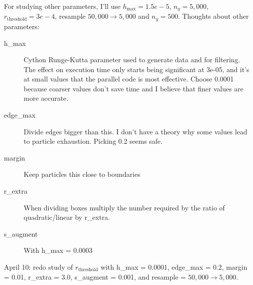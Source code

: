 \documentclass[12pt]{article}
\begin{document}
For studying other parameters, I'll use $h_{\text{max}}=1.5e-5$,
$n_y=5,000$, $r_{\text{threshold}} = 3e-4$, resample
$50,000 \rightarrow 5,000$ and $n_y = 500$.  Thoughts about other
parameters:
\begin{description}
\item[h\_max] Cython Runge-Kutta parameter used to generate data and
  for filtering.  The effect on execution time only starts being
  significant at 3e-05, and it's at small values that the parallel
  code is most effective.  Choose 0.0001 because coarser values
  don't save time and I believe that finer values are more accurate.\\
  
\item[edge\_max] Divide edges bigger than this.  I don't have a theory
  why some values lead to particle exhaustion.  Picking 0.2 seems safe.\\
  
\item[margin] Keep particles this close to boundaries\\
    
\item[r\_extra] When dividing boxes multiply the number required by
  the ratio of quadratic/linear by r\_extra.\\
  
\item[s\_augment] With h\_max = 0.0003\\
  
\end{description}

April 10: redo study of $r_{\text{threshold}}$ with h\_max = 0.0001,
edge\_max = 0.2, margin = 0.01, r\_extra = 3.0, s\_augment = 0.001, and
resample = $50,000 \rightarrow 5,000$.\\
  
\end{document}
